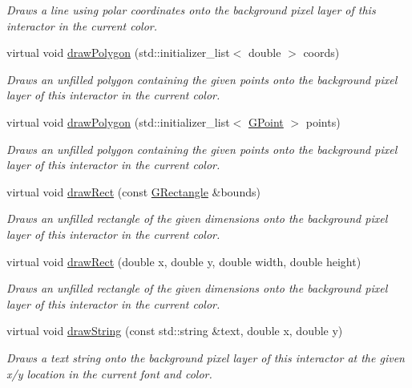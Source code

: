 \begin{DoxyCompactItemize}
\begin{DoxyCompactList}\small\item\em Draws a line using polar coordinates onto the background pixel layer of this interactor in the current color. \end{DoxyCompactList}\item 
virtual void \mbox{\hyperlink{classGDrawingSurface_afddec0a905108d8a8d6809a157f26776}{draw\+Polygon}} (std\+::initializer\+\_\+list$<$ double $>$ coords)
\begin{DoxyCompactList}\small\item\em Draws an unfilled polygon containing the given points onto the background pixel layer of this interactor in the current color. \end{DoxyCompactList}\item 
virtual void \mbox{\hyperlink{classGDrawingSurface_a021ee881e0d154dc4dd059698742889c}{draw\+Polygon}} (std\+::initializer\+\_\+list$<$ \mbox{\hyperlink{classGPoint}{G\+Point}} $>$ points)
\begin{DoxyCompactList}\small\item\em Draws an unfilled polygon containing the given points onto the background pixel layer of this interactor in the current color. \end{DoxyCompactList}\item 
virtual void \mbox{\hyperlink{classGDrawingSurface_a3dd4cc5891149dfc36746264f7289877}{draw\+Rect}} (const \mbox{\hyperlink{classGRectangle}{G\+Rectangle}} \&bounds)
\begin{DoxyCompactList}\small\item\em Draws an unfilled rectangle of the given dimensions onto the background pixel layer of this interactor in the current color. \end{DoxyCompactList}\item 
virtual void \mbox{\hyperlink{classGDrawingSurface_a4148e770ffc5474153aadd4814dbd708}{draw\+Rect}} (double x, double y, double width, double height)
\begin{DoxyCompactList}\small\item\em Draws an unfilled rectangle of the given dimensions onto the background pixel layer of this interactor in the current color. \end{DoxyCompactList}\item 
virtual void \mbox{\hyperlink{classGDrawingSurface_ad4e8551a753a77135792bbee97013675}{draw\+String}} (const std\+::string \&text, double x, double y)
\begin{DoxyCompactList}\small\item\em Draws a text string onto the background pixel layer of this interactor at the given x/y location in the current font and color. \end{DoxyCompactList}\item 

\end{DoxyCompactItemize}
